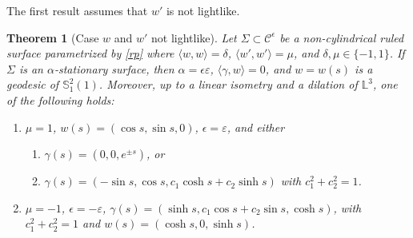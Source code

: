 \documentclass[a4paper,12pt]{amsart}
\newtheorem{theorem}{Theorem}[section]
\theoremstyle{definition}
\def\l{\mathbb L}
\def\s{\mathbb S}
\begin{document}
The first result assumes that $w'$ is not lightlike.  


\begin{theorem}[Case $w$ and $w'$ not lightlike] \label{th-nli}
Let $\Sigma \subset \mathcal{C}^\epsilon$ be a   non-cylindrical ruled surface parametrized by \eqref{rp} where $\langle w,w\rangle=\delta$, $\langle w',w' \rangle=\mu$, and $\delta,\mu\in \{-1,1 \}$. If $\Sigma$ is an $\alpha$-stationary surface, then $\alpha = \epsilon \varepsilon$, $\langle \gamma,w\rangle =0$, and $w=w(s)$ is a geodesic of $\s_1^2(1)$. Moreover, up to a linear isometry and a dilation of $\l^3$, one of the following holds:
\begin{enumerate}
\item $\mu=1$, $w(s)=(\cos s,\sin s,0)$, $\epsilon= \varepsilon$, and either
\begin{enumerate}
\item[\textnormal{(1a)}] $\gamma(s)=(0,0,e^{\pm s})$, or
\item[\textnormal{(1b)}]  $\gamma(s)=(-\sin s,\cos s,c_1 \cosh s+c_2 \sinh s)$ with $c_1^2+c_2^2=1$.
\end{enumerate}
\item $\mu=-1$,  $\epsilon= -\varepsilon$, $\gamma(s)=(\sinh s, c_1\cos s+c_2\sin s, \cosh s)$, with $c_1^2+c_2^2=1$ and $w(s)=(\cosh s,0,\sinh s)$.
 
\end{enumerate}
\end{theorem}
\end{document}
